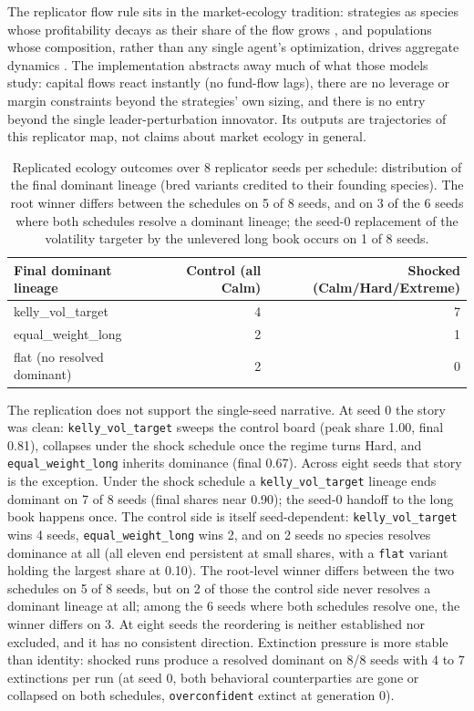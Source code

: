 The replicator flow rule sits in the market-ecology tradition: strategies as species whose profitability decays as their share of the flow grows \citep{farmer2002market}, and populations whose composition, rather than any single agent's optimization, drives aggregate dynamics \citep{lux1999scaling}. The implementation abstracts away much of what those models study: capital flows react instantly (no fund-flow lags), there are no leverage or margin constraints beyond the strategies' own sizing, and there is no entry beyond the single leader-perturbation innovator. Its outputs are trajectories of this replicator map, not claims about market ecology in general.

\begin{table}[t]
\centering
\caption{Replicated ecology outcomes over 8 replicator seeds per schedule: distribution of the final dominant lineage (bred variants credited to their founding species). The root winner differs between the schedules on 5 of 8 seeds, and on 3 of the 6 seeds where both schedules resolve a dominant lineage; the seed-0 replacement of the volatility targeter by the unlevered long book occurs on 1 of 8 seeds.}
\label{tab:f8}
\footnotesize
\setlength{\tabcolsep}{4pt}
\begin{tabular}{lrr}
\toprule
Final dominant lineage & Control (all Calm) & Shocked (Calm/Hard/Extreme) \\
\midrule
kelly\_vol\_target & 4 & 7 \\
equal\_weight\_long & 2 & 1 \\
flat (no resolved dominant) & 2 & 0 \\
\bottomrule
\end{tabular}
\end{table}

The replication does not support the single-seed narrative. At seed 0 the story was clean: \texttt{kelly\_vol\_target} sweeps the control board (peak share 1.00, final 0.81), collapses under the shock schedule once the regime turns Hard, and \texttt{equal\_weight\_long} inherits dominance (final 0.67). Across eight seeds that story is the exception. Under the shock schedule a \texttt{kelly\_vol\_target} lineage ends dominant on 7 of 8 seeds (final shares near 0.90); the seed-0 handoff to the long book happens once. The control side is itself seed-dependent: \texttt{kelly\_vol\_target} wins 4 seeds, \texttt{equal\_weight\_long} wins 2, and on 2 seeds no species resolves dominance at all (all eleven end persistent at small shares, with a \texttt{flat} variant holding the largest share at 0.10). The root-level winner differs between the two schedules on 5 of 8 seeds, but on 2 of those the control side never resolves a dominant lineage at all; among the 6 seeds where both schedules resolve one, the winner differs on 3. At eight seeds the reordering is neither established nor excluded, and it has no consistent direction. Extinction pressure is more stable than identity: shocked runs produce a resolved dominant on 8/8 seeds with 4 to 7 extinctions per run (at seed 0, both behavioral counterparties are gone or collapsed on both schedules, \texttt{overconfident} extinct at generation 0).

